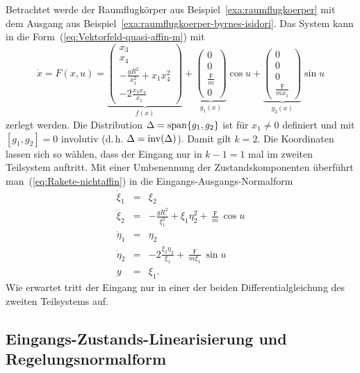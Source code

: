 \begin{example}
\label{exa:raumflugkoerper-EA-NF-reduziert}Betrachtet werde der Raumflugkörper
aus Beispiel~\ref{exa:raumflugkoerper} mit dem Ausgang aus Beispiel~\ref{exa:raumflugkoerper-byrnes-isidori}.
Das System kann in die Form~(\ref{eq:Vektorfeld-quasi-affin-m})
mit
\[
\dot{x}=F(x,u)=\underbrace{\left(\begin{array}{c}
x_{3}\\
x_{4}\\
-\frac{gR^{2}}{x_{1}^{2}}+x_{1}x_{4}^{2}\\
-2\frac{x_{3}x_{4}}{x_{1}}
\end{array}\right)}_{{\displaystyle f(x)}}+\underbrace{\left(\begin{array}{c}
0\\
0\\
\frac{\digamma}{m}\\
0
\end{array}\right)}_{{\displaystyle g}_{1}(x)}\cos u+\underbrace{\left(\begin{array}{c}
0\\
0\\
0\\
\frac{\digamma}{mx_{1}}
\end{array}\right)}_{{\displaystyle g}_{2}(x)}\sin u
\]
zerlegt werden. Die Distribution $\Delta={\operatorname{span}}\{g_{1},g_{2}\}$ ist
für $x_{1}\neq0$ definiert und mit $[g_{1},g_{2}]=0$ involutiv (d.\,h.
$\Delta={\operatorname{inv}}(\Delta)$). Damit gilt $k=2$. Die Koordinaten lassen
sich so wählen, dass der Eingang nur in $k-1=1$ mal im zweiten Teilsystem
auftritt. Mit einer Umbenennung der Zustandskomponenten überführt
man~(\ref{eq:Rakete-nichtaffin}) in die Eingangs-Ausgangs-Normalform
\[
\begin{array}{lcl}
\dot{\xi}_{1} & = & \xi_{2}\\
\dot{\xi}_{2} & = & -\frac{gR^{2}}{\xi_{1}^{2}}+\xi_{1}\eta_{2}^{2}+\frac{\digamma}{m}\cos u\\
\dot{\eta}_{1} & = & \eta_{2}\\
\dot{\eta}_{2} & = & -2\frac{\xi_{2}\eta_{2}}{\xi_{1}}+\frac{\digamma}{m\xi_{1}}\sin u\\
y & = & \xi_{1}.
\end{array}
\]
Wie erwartet tritt der Eingang nur in einer der beiden Differentialgleichung
des zweiten Teilsystems auf.
\end{example}

\subsection{Eingangs-Zustands-Linearisierung und Regelungsnormalform}

